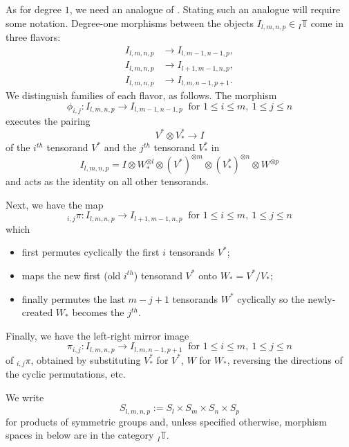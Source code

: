 \documentclass[11pt]{article}
\theoremstyle{plain}
\theoremstyle{nonumberplain}
\theoremstyle{plain}
\numberwithin{equation}{section}
\theoremstyle{nonumberplain}
\newcommand\bT{{\mathbb T}}
\newcommand\1{{\bf 1}}
\begin{document}
As for degree $1$, we need an analogue of \cite[Lemma 3.25]{us0}. Stating such an analogue will require some notation. Degree-one morphisms between the objects $I_{l,m,n,p}\in {}_I\bT$ come in three flavors:
\begin{align*}
  I_{l,m,n,p}&\to I_{l,m-1,n-1,p},\\
  I_{l,m,n,p}&\to I_{l+1,m-1,n,p},\\
  I_{l,m,n,p}&\to I_{l,m,n-1,p+1}.
\end{align*}
We distinguish families of each flavor, as follows. The morphism
\begin{equation*}
  \phi_{i,j}:I_{l,m,n,p}\to I_{l,m-1,n-1,p}\ \text{ for } 1\le i \le m,~1\le j \le n
\end{equation*}
executes the pairing
\begin{equation*}
  V^*\otimes V_*^*\to I
\end{equation*}
of the $i^{th}$ tensorand $V^*$ and the $j^{th}$ tensorand $V_*^*$ in
\begin{equation*}
  I_{l,m,n,p} = I\otimes W_*^{\otimes l}\otimes (V^*)^{\otimes m}\otimes (V_*^*)^{\otimes n} \otimes W^{\otimes p}
\end{equation*}
and acts as the identity on all other tensorands.

Next, we have the map
\begin{equation*}
{}_{i,j}\pi:I_{l,m,n,p}\to I_{l+1,m-1,n,p}\ \text{ for } 1\le i \le m,~1\le j \le n
\end{equation*}
which
\begin{itemize}
\item[$-$] first permutes cyclically the first $i$ tensorands $V^*$;
\item[$-$] maps the new first (old $i^{th}$) tensorand $V^*$ onto $W_*=V^*/V_*$;
\item[$-$] finally permutes the last $m-j+1$ tensorands $W^*$ cyclically so the newly-created $W_*$ becomes the $j^{th}$.
\end{itemize}

Finally, we have the left-right mirror image 
\begin{equation*}
\pi_{i,j}:I_{l,m,n,p}\to I_{l,m,n-1,p+1}\ \text{ for } 1\le i \le m,~1\le j \le n
\end{equation*}
of ${}_{i,j}\pi$, obtained by substituting $V_*^*$ for $V^*$, $W$ for $W_*$, reversing the directions of the cyclic permutations, etc.


We write
\begin{equation*}
  S_{l,m,n,p}:=S_l\times S_m\times S_n\times S_p
\end{equation*}
for products of symmetric groups and, unless specified otherwise, morphism spaces in  below are in the category ${}_I\bT$. 
\end{document}
